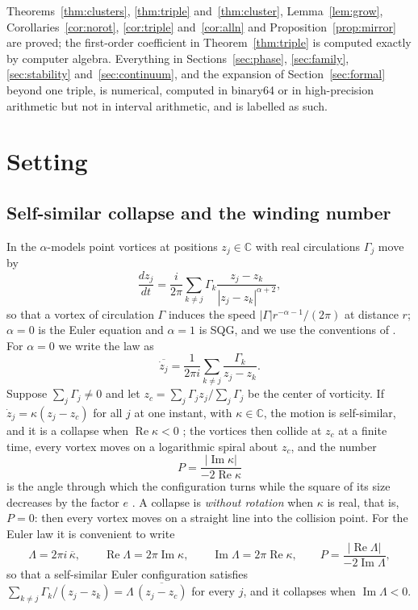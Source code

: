 \documentclass[11pt]{article}
\theoremstyle{definition}
\newcommand{\re}{\operatorname{Re}}
\newcommand{\im}{\operatorname{Im}}
\newcommand{\C}{\mathbb{C}}
\begin{document}
Theorems~\ref{thm:clusters}, \ref{thm:triple} and~\ref{thm:cluster}, Lemma~\ref{lem:grow}, Corollaries~\ref{cor:norot}, \ref{cor:triple} and~\ref{cor:alln} and Proposition~\ref{prop:mirror} are proved; the first-order coefficient in Theorem~\ref{thm:triple} is computed exactly by computer algebra. Everything in Sections~\ref{sec:phase}, \ref{sec:family}, \ref{sec:stability} and~\ref{sec:continuum}, and the expansion of Section~\ref{sec:formal} beyond one triple, is numerical, computed in binary64 or in high-precision arithmetic but not in interval arithmetic, and is labelled as such.

\section{Setting}\label{sec:setting}

\subsection{Self-similar collapse and the winding number}

In the $\alpha$-models point vortices at positions $z_j \in \C$ with real circulations $\Gamma_j$ move by
\begin{equation}\label{eq:alpha}
  \frac{dz_j}{dt} = \frac{i}{2\pi} \sum_{k \ne j} \Gamma_k \frac{z_j - z_k}{|z_j - z_k|^{\alpha + 2}},
\end{equation}
so that a vortex of circulation $\Gamma$ induces the speed $|\Gamma| r^{-\alpha-1}/(2\pi)$ at distance $r$; $\alpha = 0$ is the Euler equation and $\alpha = 1$ is SQG, and we use the conventions of \cite[Sect.~2]{mw2026}. For $\alpha = 0$ we write the law as
\begin{equation}\label{eq:bs}
  \overline{\dot z_j} = \frac{1}{2\pi i} \sum_{k \ne j} \frac{\Gamma_k}{z_j - z_k}.
\end{equation}
Suppose $\sum_j \Gamma_j \ne 0$ and let $z_c = \sum_j \Gamma_j z_j/\sum_j \Gamma_j$ be the center of vorticity. If $\dot z_j = \kappa(z_j - z_c)$ for all $j$ at one instant, with $\kappa \in \C$, the motion is self-similar, and it is a collapse when $\re\kappa < 0$ \cite[Sect.~2]{mw2026}; the vortices then collide at $z_c$ at a finite time, every vortex moves on a logarithmic spiral about $z_c$, and the number
\begin{equation}\label{eq:P}
  P = \frac{|\im\kappa|}{-2\re\kappa}
\end{equation}
is the angle through which the configuration turns while the square of its size decreases by the factor $e$ \cite[Eq.~(4)]{mw2026}. A collapse is \emph{without rotation} when $\kappa$ is real, that is, $P = 0$: then every vortex moves on a straight line into the collision point. For the Euler law it is convenient to write
\begin{equation}\label{eq:Lambda}
  \Lambda = 2\pi i\,\overline{\kappa}, \qquad \re\Lambda = 2\pi\im\kappa, \qquad \im\Lambda = 2\pi\re\kappa, \qquad P = \frac{|\re\Lambda|}{-2\im\Lambda},
\end{equation}
so that a self-similar Euler configuration satisfies $\sum_{k \ne j} \Gamma_k/(z_j - z_k) = \Lambda\,\overline{(z_j - z_c)}$ for every $j$, and it collapses when $\im\Lambda < 0$.
\end{document}
